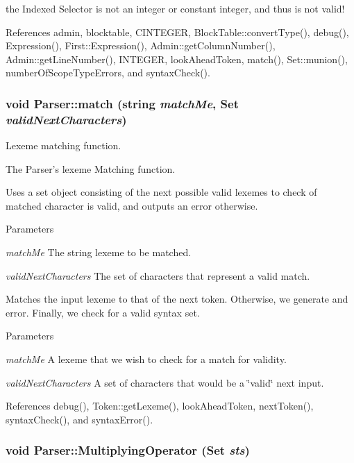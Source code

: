 the Indexed Selector is not an integer or constant integer, and thus is not valid! 



References admin, blocktable, CINTEGER, BlockTable::convertType(), debug(), Expression(), First::Expression(), Admin::getColumnNumber(), Admin::getLineNumber(), INTEGER, lookAheadToken, match(), Set::munion(), numberOfScopeTypeErrors, and syntaxCheck().

\hypertarget{classParser_afd75ba38a886da3930c4a29f5d353a62}{
\subsubsection[{match}]{\setlength{\rightskip}{0pt plus 5cm}void Parser::match (string {\em matchMe}, \/  {\bf Set} {\em validNextCharacters})}}
\label{classParser_afd75ba38a886da3930c4a29f5d353a62}


Lexeme matching function. 

The Parser's lexeme Matching function.

Uses a set object consisting of the next possible valid lexemes to check of matched character is valid, and outputs an error otherwise. 
\begin{DoxyParams}{Parameters}
\item[{\em matchMe}]The string lexeme to be matched. \item[{\em validNextCharacters}]The set of characters that represent a valid match.\end{DoxyParams}
Matches the input lexeme to that of the next token. Otherwise, we generate and error. Finally, we check for a valid syntax set.


\begin{DoxyParams}{Parameters}
\item[{\em matchMe}]A lexeme that we wish to check for a match for validity. \item[{\em validNextCharacters}]A set of characters that would be a \char`\"{}valid\char`\"{} next input. \end{DoxyParams}


References debug(), Token::getLexeme(), lookAheadToken, nextToken(), syntaxCheck(), and syntaxError().

\hypertarget{classParser_a0f016865b3ae30a62a06abbb7fca7345}{
\subsubsection[{MultiplyingOperator}]{\setlength{\rightskip}{0pt plus 5cm}void Parser::MultiplyingOperator ({\bf Set} {\em sts})}}
\label{classParser_a0f016865b3ae30a62a06abbb7fca7345}


